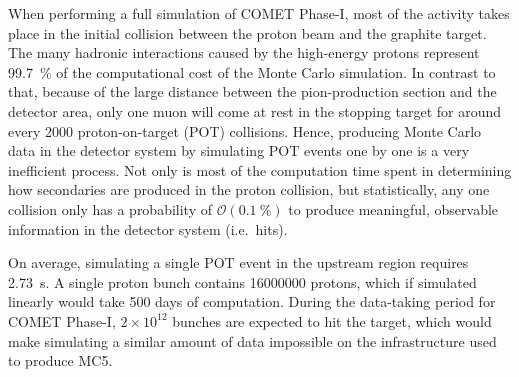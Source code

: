 When performing a full simulation of COMET Phase-I, most of the activity takes place in the initial collision between the proton beam and the graphite target. The many hadronic interactions caused by the high-energy protons represent \SI{99.7}{\percent} of the computational cost of the Monte Carlo simulation.
In contrast to that, because of the large distance between the pion-production section and the detector area, only one muon will come at rest in the stopping target for around every \num{2000} proton-on-target (POT) collisions. Hence, producing Monte Carlo data in the detector system by simulating POT events one by one is a very inefficient process. Not only is most of the computation time spent in determining how secondaries are produced in the proton collision, but statistically, any one collision only has a probability of $\mathcal{O}(\SI{0.1}{\percent})$ to produce meaningful, observable information in the detector system (i.e.\ hits).

On average, simulating a single POT event in the upstream region requires \SI{2.73}{\second}. A single proton bunch contains \num{16000000} protons, which if simulated linearly would take 500 days of computation. During the data-taking period for COMET Phase-I, $2\times10^{12}$ bunches are expected to hit the target, which would make simulating a similar amount of data impossible on the infrastructure used to produce MC5.


